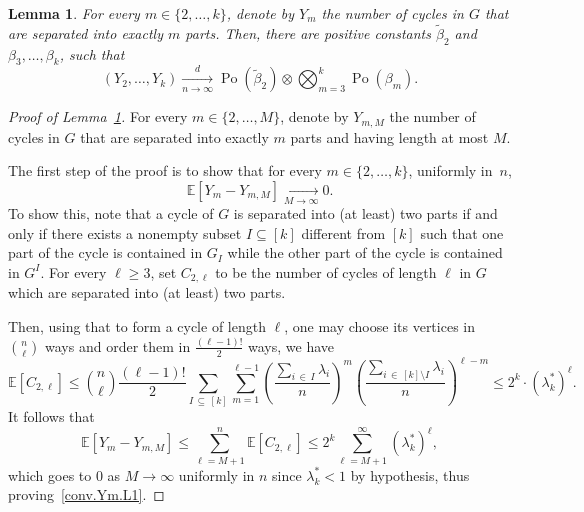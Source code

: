 \documentclass[10pt]{amsart}
\newtheorem{lemm}[theo]{Lemma}\newtheorem{prop}[theo]{Proposition}\newtheorem{coro}[theo]{Corollary}\newtheorem{conj}[theo]{Conjecture}
\theoremstyle{definition}\newtheorem{defi}[theo]{Definition}\newtheorem{rema}[theo]{Remark}\newtheorem{exam}[theo]{Example}\newtheorem{exem}[theo]{Example}\newtheorem{nota}[theo]{Notation}
\newcommand{\bbE}{\mathbb{E}}
\DeclareMathOperator{\rPo}{Po}
\begin{document}
\begin{lemm}\label{lem:separated cycles}
For every $m\in \{2,\dots,k\}$, denote by $Y_m$ the number of cycles in $G$ that are separated into exactly $m$ parts. Then, there are positive constants $\widetilde \beta_2$ and $\beta_3, \ldots, \beta_k$, such that
\[
(Y_2, \ldots, Y_k)\xrightarrow[n\to \infty]{d} \rPo(\widetilde \beta_2)\otimes \bigotimes_{m=3}^k \rPo(\beta_m).
\]
\end{lemm}
\begin{proof}[Proof of Lemma~\ref{lem:separated cycles}]
For every $m\in \{2,\ldots, M\}$, denote by $Y_{m,M}$ the number of cycles in $G$ that are separated into exactly $m$ parts and having length at most $M$.


The first step of the proof is to show that for every $m\in \{2,\dots,k\}$, uniformly in~$n$,
\begin{equation}\label{conv.Ym.L1}
\bbE[Y_m-Y_{m,M}] \xrightarrow[M\to \infty]{} 0.
\end{equation}
To show this, note that a cycle of $G$ is separated into (at least) two parts if and only if there exists a nonempty subset $I\subseteq [k]$ different from $[k]$ such that one part of the cycle is contained in $G_I$ while the other part of the cycle is contained in $G^I$. For every $\ell \ge 3$, set $C_{2,\ell}$ to be the number of cycles of length $\ell$ in $G$ which are separated into (at least) two parts.


Then, using that to form a cycle of length $\ell$, one may choose its vertices in $\binom{n}{\ell}$ ways and order them in $\frac{(\ell-1)!}{2}$ ways, we have
\begin{equation}\label{eq:lem cycles}
\bbE [C_{2,\ell}] \le \binom{n}{\ell} \frac{(\ell-1)!}{2} \sum_{I\,\subseteq\,[k]} \sum_{m=1}^{\ell-1} \left(\frac{\sum_{i\,\in\,I} \lambda_i}{n}\right)^m \left(\frac{\sum_{i\,\in\,[k]\setminus I} \lambda_i}{n}\right)^{\ell-m}\le 2^k\cdot (\lambda_k^*)^\ell.
\end{equation}
It follows that
\begin{equation*}
\bbE\left[Y_m - Y_{m,M}\right] \le \sum_{\ell= M+1}^n \bbE [C_{2,\ell}]\le 2^k \sum_{\ell=M+1}^\infty (\lambda_k^*)^{\ell},
\end{equation*}
which goes to $0$ as $M\to \infty$ uniformly in $n$ since $\lambda_k^*<1$ by hypothesis, thus proving~\eqref{conv.Ym.L1}.


\end{proof}
\end{document}
